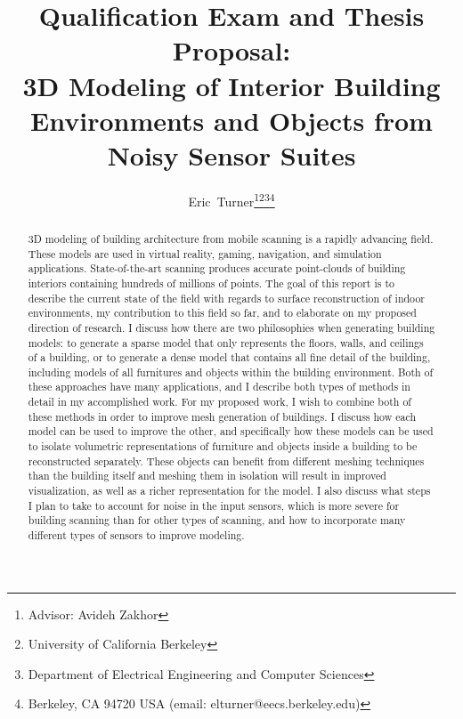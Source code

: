 \documentclass[journal]{IEEEtran}
\begin{document}
\title{Qualification Exam and Thesis Proposal: \\
3D Modeling of Interior Building Environments and Objects from Noisy Sensor Suites}

\author{Eric~Turner\thanks{Advisor: Avideh Zakhor}\thanks{University of California Berkeley}\thanks{Department of Electrical Engineering and Computer Sciences}\thanks{Berkeley, CA 94720 USA (email: elturner@eecs.berkeley.edu)}}

\maketitle

\begin{abstract}

3D modeling of building architecture from mobile scanning is a rapidly advancing field.  These models are used in virtual reality, gaming, navigation, and simulation applications.  State-of-the-art scanning produces accurate point-clouds of building interiors containing hundreds of millions of points.  The goal of this report is to describe the current state of the field with regards to surface reconstruction of indoor environments, my contribution to this field so far, and to elaborate on my proposed direction of research.  I discuss how there are two philosophies when generating building models:  to generate a sparse model that only represents the floors, walls, and ceilings of a building, or to generate a dense model that contains all fine detail of the building, including models of all furnitures and objects within the building environment.  Both of these approaches have many applications, and I describe both types of methods in detail in my accomplished work.  For my proposed work, I wish to combine both of these methods in order to improve mesh generation of buildings.  I discuss how each model can be used to improve the other, and specifically how these models can be used to isolate volumetric representations of furniture and objects inside a building to be reconstructed separately.  These objects can benefit from different meshing techniques than the building itself and meshing them in isolation will result in improved visualization, as well as a richer representation for the model.  I also discuss what steps I plan to take to account for noise in the input sensors, which is more severe for building scanning than for other types of scanning, and how to incorporate many different types of sensors to improve modeling.

\end{abstract}
\end{document}
